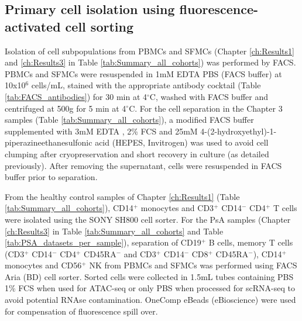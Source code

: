 \subsection{Primary cell isolation using fluorescence-activated cell sorting}
Isolation of cell subpopulations from PBMCs and SFMCs (Chapter \ref{ch:Results1} and \ref{ch:Results3} in Table \ref{tab:Summary_all_cohorts}) was performed by FACS. PBMCs and SFMCs were resuspended in 1mM EDTA PBS (FACS buffer) at 10x10$^6$ cells/mL, stained with the appropriate antibody cocktail (Table \ref{tab:FACS_antibodies}) for 30 min at 4{$^\circ$}C, washed with FACS buffer and centrifuged at 500g for 5 min at 4{$^\circ$}C. For the cell separation in the Chapter 3 samples (Table \ref{tab:Summary_all_cohorts}), a modified FACS buffer supplemented with 3mM EDTA , 2\% FCS and 25mM 4-(2-hydroxyethyl)-1-piperazineethanesulfonic acid (HEPES, Invitrogen) was used to avoid cell clumping after cryopreservation and short recovery in culture (as detailed previously). After removing the supernatant, cells were resuspended in FACS buffer prior to separation. 

From the healthy control samples of Chapter \ref{ch:Results1} (Table \ref{tab:Summary_all_cohorts}), CD14$^{+}$ monocytes and CD3$^+$ CD14$^{-}$ CD4$^{+}$ T cells were isolated using the SONY SH800 cell sorter. For the PsA samples (Chapter \ref{ch:Results3} in Table \ref{tab:Summary_all_cohorts} and Table \ref{tab:PSA_datasets_per_sample}), separation of CD19$^+$ B cells, memory T cells (CD3$^+$ CD14$^-$ CD4$^+$ CD45RA$^{-}$ and CD3$^+$ CD14$^-$ CD8$^+$ CD45RA$^-$), CD14$^+$ monocytes and CD56$^+$ NK from PBMCs and SFMCs was performed using FACS Aria (BD) cell sorter. Sorted cells were collected in 1.5mL tubes containing PBS 1\% FCS when used for ATAC-seq or only PBS when processed for scRNA-seq to avoid potential RNAse contamination. OneComp eBeads (eBioscience) were used for compensation of fluorescence spill over.



